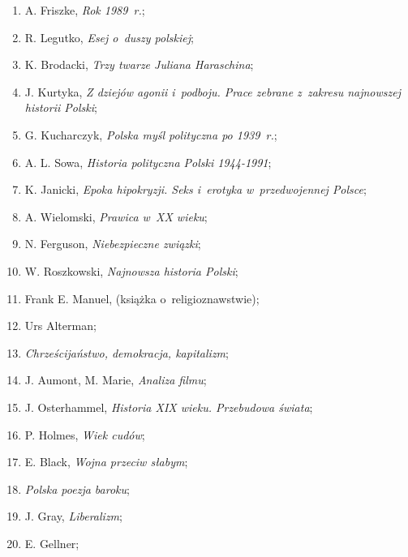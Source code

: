 \documentclass[a4paper,11pt]{article}
\begin{document}
\begin{enumerate}
\item A. Friszke, \textit{Rok 1989~r.};

\item R. Legutko, \textit{Esej o~duszy polskiej};

\item K. Brodacki, \textit{Trzy twarze Juliana Haraschina};

\item J. Kurtyka, \textit{Z dziejów agonii i~podboju. Prace zebrane
    z~zakresu najnowszej historii Polski};

\item G. Kucharczyk, \textit{Polska myśl polityczna po 1939~r.};

\item A. L. Sowa, \textit{Historia polityczna Polski 1944-1991};

\item K. Janicki, \textit{Epoka hipokryzji. Seks i~erotyka
    w~przedwojennej Polsce};

\item A. Wielomski, \textit{Prawica w~XX wieku};

\item N. Ferguson, \textit{Niebezpieczne związki};

\item W. Roszkowski, \textit{Najnowsza historia Polski};

\item Frank E. Manuel, (książka o~religioznawstwie);

\item Urs Alterman;

\item \textit{Chrześcijaństwo, demokracja, kapitalizm};

\item J. Aumont, M. Marie, \textit{Analiza filmu};

\item J. Osterhammel, \emph{Historia XIX wieku. Przebudowa świata};

\item P. Holmes, \emph{Wiek cudów};

\item E. Black, \emph{Wojna przeciw słabym};

\item \emph{Polska poezja baroku};

\item J. Gray, \emph{Liberalizm};

\item E. Gellner;


\end{enumerate}
\end{document}

